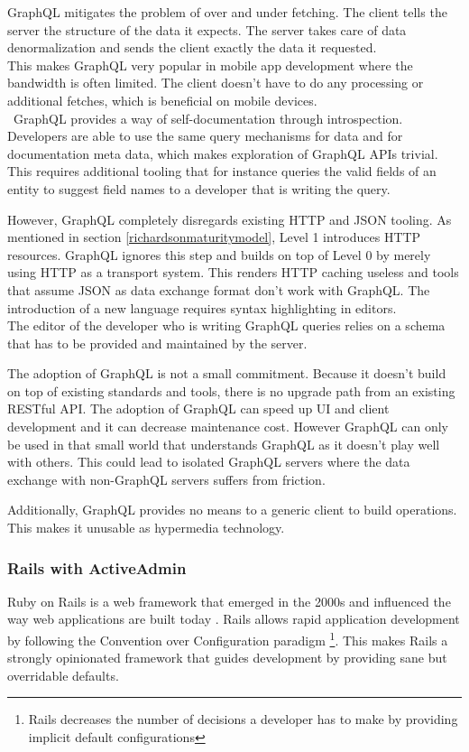 GraphQL mitigates the problem of over and under fetching. The client tells the server the structure of the data it expects. The server takes care of data denormalization and sends the client exactly the data it requested. \\ This makes GraphQL very popular in mobile app development where the bandwidth is often limited. The client doesn't have to do any processing or additional fetches, which is beneficial on mobile devices. \\\
GraphQL provides a way of self-documentation through introspection. Developers are able to use the same query mechanisms for data and for documentation meta data, which makes exploration of GraphQL APIs trivial. This requires additional tooling that for instance queries the valid fields of an entity to suggest field names to a developer that is writing the query.

However, GraphQL completely disregards existing HTTP and JSON tooling. As mentioned in section \ref{richardsonmaturitymodel}, Level 1 introduces HTTP resources. GraphQL ignores this step and builds on top of Level 0 by merely using HTTP as a transport system. This renders HTTP caching useless and tools that assume JSON as data exchange format don't work with GraphQL. The introduction of a new language requires syntax highlighting in editors. \\
The editor of the developer who is writing GraphQL queries relies on a schema that has to be provided and maintained by the server.

The adoption of GraphQL is not a small commitment. Because it doesn't build on top of existing standards and tools, there is no upgrade path from an existing RESTful API. The adoption of GraphQL can speed up UI and client development and it can decrease maintenance cost. However GraphQL can only be used in that small world that understands GraphQL as it doesn't play well with others. This could lead to isolated GraphQL servers where the data exchange with non-GraphQL servers suffers from friction.

Additionally, GraphQL provides no means to a generic client to build operations. This makes it unusable as hypermedia technology.

\subsubsection{Rails with ActiveAdmin}
Ruby on Rails is a web framework that emerged in the 2000s and influenced the way web applications are built today \citep{rubyonrails}. Rails allows rapid application development by following the Convention over Configuration paradigm \footnote{Rails decreases the number of decisions a developer has to make by providing implicit default configurations}. This makes Rails a strongly opinionated framework that guides development by providing sane but overridable defaults.

